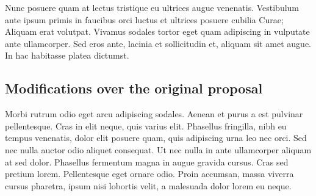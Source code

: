Nunc posuere quam at lectus tristique eu ultrices augue venenatis. Vestibulum ante ipsum primis in faucibus orci luctus et ultrices posuere cubilia Curae; Aliquam erat volutpat. Vivamus sodales tortor eget quam adipiscing in vulputate ante ullamcorper. Sed eros ante, lacinia et sollicitudin et, aliquam sit amet augue. In hac habitasse platea dictumst.


\subsection{Modifications over the original proposal}
Morbi rutrum odio eget arcu adipiscing sodales. Aenean et purus a est pulvinar pellentesque. Cras in elit neque, quis varius elit. Phasellus fringilla, nibh eu tempus venenatis, dolor elit posuere quam, quis adipiscing urna leo nec orci. Sed nec nulla auctor odio aliquet consequat. Ut nec nulla in ante ullamcorper aliquam at sed dolor. Phasellus fermentum magna in augue gravida cursus. Cras sed pretium lorem. Pellentesque eget ornare odio. Proin accumsan, massa viverra cursus pharetra, ipsum nisi lobortis velit, a malesuada dolor lorem eu neque.